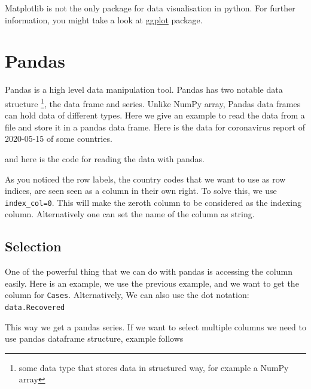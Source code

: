\documentclass[10pt,a4paper]{article}
\newcommand{\te}{\texttt}
\begin{document}
Matplotlib is not the only package for data visualisation in python. For further information, you might take a look at \href{http://ggplot.yhathq.com/how-it-works.html}{ggplot} package.




















\section{Pandas} \label{pandas}
Pandas is a high level data manipulation tool. Pandas has two notable data structure \footnote{some data type that stores data in structured way, for example a NumPy array}, the data frame and series. Unlike NumPy array, Pandas data frames can hold data of different types. Here  we give an example to read the data from a file and store it in a pandas data frame. Here is the data for coronavirus report of 2020-05-15 of some countries. 

and here is the code for reading the data with pandas.

As you noticed the row labels, the country codes that we want to use as row indices, are seen  seen as a column in their own right. To solve this, we use \te{index\_col=0}. This will make the zeroth column to be considered as the indexing column. Alternatively one can set the name of the column as string. 


\subsection{Selection}
One of the powerful thing that we can do with pandas is accessing the column easily. Here is an example, we use the previous example, and we want to get the column for \te{Cases}. Alternatively, We can also use the dot notation: \te{data.Recovered}



This way we get a pandas series. If we want to select multiple columns we need to use pandas dataframe structure, example follows

\end{document}
